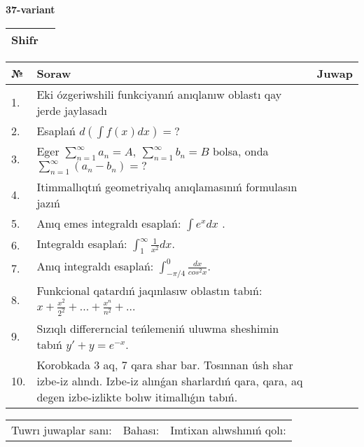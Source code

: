 \documentclass{article}
\begin{document}
  \egroup
  
  \newpage
  
  
  \textbf{37-variant}\\
  
  \bgroup
  \def\arraystretch{1.6} %
  
  \begin{tabular}{|m{5.7cm}|m{9.5cm}|}
  \hline
  Shifr & \\
  \hline
  \end{tabular}
  
  \vspace{1cm}
  
  \begin{tabular}{|m{0.7cm}|m{10cm}|m{4cm}|}
  \hline
  № & Soraw & Juwap \\
  \hline
  1. & Eki ózgeriwshili funkciyanıń anıqlanıw oblastı qay jerde jaylasadı &  \\
  \hline
  2. & Esaplań \(d\left( \int{f(x)dx} \right) = ?\) &  \\
  \hline
  3. & Eger \(\sum_{n = 1}^{\infty}a_{n} = A,\ \sum_{n = 1}^{\infty}b_{n} = B\) bolsa, onda \(\sum_{n = 1}^{\infty}\left( a_{n} - b_{n} \right) = ?\) &  \\
  \hline
  4. & Itimmallıqtıń geometriyalıq anıqlamasınıń formulasın jazıń &  \\
  \hline
  5. & Anıq emes integraldı esaplań: \(\int{e^{x}dx}\) . &  \\
  \hline
  6. & Integraldı esaplań: \(\int_{1}^{\infty}{\frac{1}{x^2 }dx}\). &  \\
  \hline
  7. & Anıq integraldı esaplań: \(\int_{- \pi/4}^{0}\frac{dx}{cos^2 x}\). &  \\
  \hline
  8. & Funkcional qatardıń jaqınlasıw oblastın tabıń: \(x + \frac{x^2 }{2^2 } + ... + \frac{x^{n}}{n^2 } + ...\) &  \\
  \hline
  9. & Sızıqlı differerncial teńlemeniń uluwma sheshimin tabıń \(y' + y = e^{- x}\). &  \\
  \hline
  10. & Korobkada 3 aq, 7 qara shar bar. Tosınnan úsh shar izbe-iz alındı. Izbe-iz alınǵan sharlardıń qara, qara, aq degen izbe-izlikte bolıw itimallıǵın tabıń. &  \\
  \hline
  \end{tabular}
  
  \vspace{1cm}
  
  \begin{tabular}{lll}
  Tuwrı juwaplar sanı: \underline{\hspace{1.5cm}} & 
  Bahası: \underline{\hspace{1.5cm}} & 
  Imtixan alıwshınıń qolı: \underline{\hspace{2cm}} \\
  \end{tabular}
  
\end{document}
